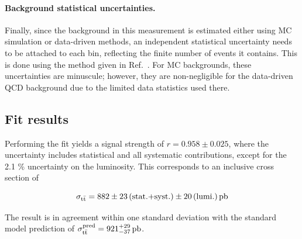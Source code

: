 \paragraph{Background statistical uncertainties.}

Finally, since the background in this measurement is estimated either using MC simulation or data-driven methods, an independent statistical uncertainty needs to be attached to each bin, reflecting the finite number of events it contains. This is done using the method given in Ref.~\cite{Barlow:1993dm}. For MC backgrounds, these uncertainties are minuscule; however, they are non-negligible for the data-driven QCD background due to the limited data statistics used there.

\subsection{Fit results}

Performing the fit yields a \ttbar signal strength of $r = 0.958 \pm 0.025$, where the uncertainty includes statistical and all systematic contributions, except for the 2.1 \% uncertainty on the luminosity. This corresponds to an inclusive \ttbar cross section of

\[
    \sigma_{\mathrm{t \bar{t}}} = 882 \pm 23 \, \text{(stat.+syst.)} \pm 20 \, \text{(lumi.)} \, \text{pb}
\]

The result is in agreement within one standard deviation with the standard model prediction of $\sigma_{\mathrm{t \bar{t}}}^{\text{pred}} = 921^{+29}_{-37} \, \text{pb}$.


